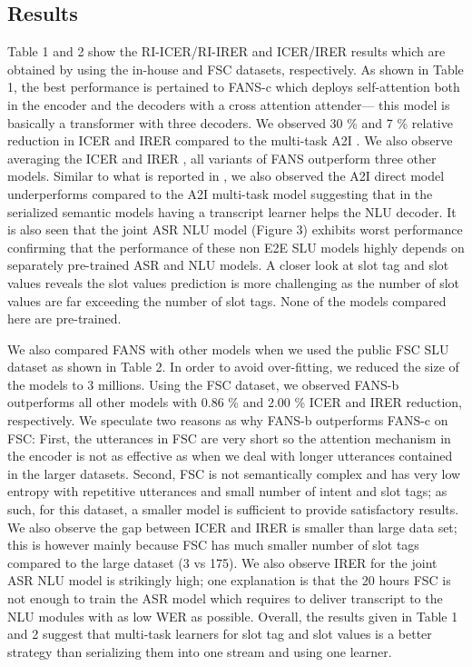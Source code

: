 \documentclass[a4paper]{article}
\begin{document}
\subsection{Results}
Table 1 and 2 show the RI-ICER/RI-IRER and ICER/IRER results which are obtained by using the in-house and FSC datasets, respectively. As shown in Table 1,  the best performance is pertained to FANS-c  which deploys self-attention both in the encoder and the decoders with a cross attention attender--- this model  is basically a transformer with three decoders. We observed  30 \%  and 7 \% relative reduction in ICER and IRER compared to the multi-task A2I  \cite{haghani2018audio}. We also observe averaging the ICER and IRER , all variants of FANS outperform three other models. Similar to what is reported in \cite{haghani2018audio}, we also observed the  A2I direct model underperforms compared to the A2I multi-task model suggesting that in the serialized semantic models having a transcript learner helps the NLU decoder. It is also seen that the joint ASR NLU model (Figure 3) exhibits worst performance confirming that the performance of these non E2E  SLU models highly depends on separately pre-trained ASR and NLU models.   A closer look at slot tag and slot values reveals the slot values prediction is more challenging as the number of slot values  are far exceeding the number of slot tags.  None of the models compared here are pre-trained.


We also compared FANS with other models when we used the public FSC SLU dataset as shown in Table 2. In order to avoid over-fitting, we reduced the size of the models to  3 millions. Using the FSC dataset, we observed  FANS-b outperforms all other models with 0.86 \% and 2.00 \% ICER  and IRER reduction, respectively.  We speculate two reasons as why FANS-b outperforms FANS-c on FSC: First, the utterances in FSC are very short so the attention mechanism in the encoder is not as effective as when we deal with longer utterances contained in the larger datasets. Second, FSC  is not semantically complex and has very low entropy with repetitive utterances and small number of  intent  and slot tags; as such, for this dataset, a smaller model is sufficient to provide satisfactory results.  We also observe the gap between ICER and IRER is smaller than large data set; this is however mainly because FSC has much smaller number of slot tags compared to the large dataset (3 vs 175).  We also observe IRER for the joint ASR NLU model is strikingly high; one explanation is that the 20 hours FSC is not enough to train the ASR model which requires to deliver transcript to the NLU modules with as low WER as possible. Overall, the results  given in Table 1 and 2 suggest that multi-task learners for slot tag and slot values is a better strategy than serializing them into one stream and using one learner.
\end{document}
